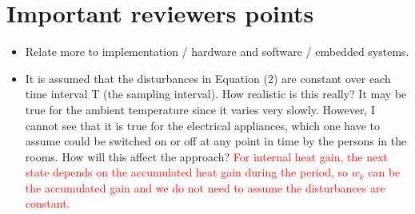 \documentclass{sig-alternate}
\begin{document}

\section{Important reviewers points}

\begin{itemize}
\item Relate more to implementation / hardware and software / embedded systems.
\item It is assumed that the disturbances in Equation (2) are constant over each time
interval T (the sampling interval). How realistic is this really? It may be
true for the ambient temperature since it varies very slowly. However, I cannot
see that it is true for the electrical appliances, which one have to assume
could be switched on or off at any point in time by the persons in the rooms.
How will this affect the approach? \textcolor{red}{For internal heat gain, the next state depends on the accumulated heat gain during the period, so $w_{k}$ can be the accumulated gain and we do not need to assume the disturbances are constant.}

\end{itemize}
\end{document}
